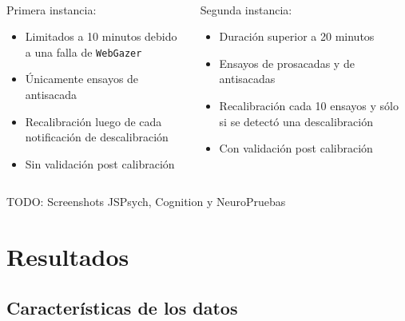 \documentclass[aspectratio=169]{beamer}
\begin{document}
\begin{frame}{~}
  \begin{columns}
    \begin{column}{0.5\textwidth}
      Primera instancia:
      \begin{itemize}
        \item Limitados a 10 minutos debido a una falla de \texttt{WebGazer}
        \item Únicamente ensayos de antisacada
        \item Recalibración luego de cada notificación de descalibración
        \item Sin validación post calibración
      \end{itemize}
    \end{column}
    \begin{column}{0.5\textwidth}
      Segunda instancia:
      \begin{itemize}
        \item Duración superior a 20 minutos
        \item Ensayos de prosacadas y de antisacadas

        \item Recalibración cada 10 ensayos y sólo si se detectó una
          descalibración
        \item Con validación post calibración
      \end{itemize}
    \end{column}
  \end{columns}

  TODO: Screenshots JSPsych, Cognition y NeuroPruebas
\end{frame}

\section{Resultados}

\subsection{Características de los datos}
\end{document}
